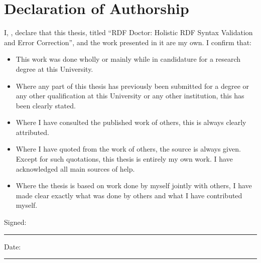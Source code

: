 \section*{Declaration of Authorship}

I, \newauthor, declare that this thesis, titled ``RDF Doctor: Holistic RDF Syntax Validation and Error Correction'', and the work presented in it are my own. I confirm that:

\begin{itemize}
\item This work was done wholly or mainly while in candidature for a research degree at this
University.
\item Where any part of this thesis has previously been submitted for a degree or any other
qualification at this University or any other institution, this has been clearly stated.
\item Where I have consulted the published work of others, this is always clearly attributed.
\item Where I have quoted from the work of others, the source is always given. Except for such quotations, this thesis is entirely my own work. I have acknowledged all main sources of help.
\item Where the thesis is based on work done by myself jointly with others, I have made clear exactly what was done by others and what I have contributed myself.\\[1cm]

\end{itemize}

Signed:\par
\rule[0.66\baselineskip]{12cm}{0.4pt}

\vspace{6mm}
Date:\par
\rule[0.66\baselineskip]{12cm}{0.4pt}
